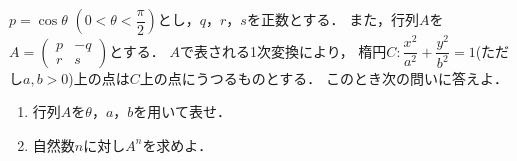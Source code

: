 \documentclass[../../main.tex]{subfiles}
\begin{document}
$p=\cos\theta$ $\displaystyle \left( 0<\theta<\dfrac{\pi}{2} \right)$とし，$q$，$r$，$s$を正数とする．
また，行列$A$を$A=
\begin{pmatrix} p & -q \\ r & s
\end{pmatrix}$とする．
$A$で表される1次変換により，
楕円$\displaystyle C: \dfrac{x^2}{a^2}+\dfrac{y^2}{b^2}=1$(ただし$a,b>0$)上の点は$C$上の点にうつるものとする．
このとき次の問いに答えよ．
\begin{enumerate}
  \item 行列$A$を$\theta$，$a$，$b$を用いて表せ．
  \item 自然数$n$に対し$A^n$を求めよ．
\end{enumerate}
\end{document}
